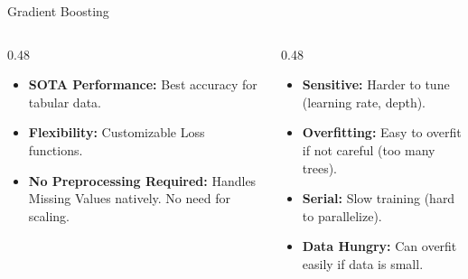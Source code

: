 \begin{frame}{Gradient Boosting}
    \begin{columns}[T]
        \begin{column}{0.48\textwidth}
            \begin{tcolorbox}[colback=green!5, title=\textbf{Advantages}]
                \small
                \begin{itemize}
                    \item \textbf{SOTA Performance:} Best accuracy for tabular data.
                    \item \textbf{Flexibility:} Customizable Loss functions.
                    \item \textbf{No Preprocessing Required:} Handles Missing Values natively. No need for scaling.
                \end{itemize}
            \end{tcolorbox}
        \end{column}
        \begin{column}{0.48\textwidth}
            \begin{tcolorbox}[colback=red!5, title=\textbf{Disadvantages}]
                \small
                \begin{itemize}
                    \item \textbf{Sensitive:} Harder to tune (learning rate, depth).
                    \item \textbf{Overfitting:} Easy to overfit if not careful (too many trees).
                    \item \textbf{Serial:} Slow training (hard to parallelize).
                    \item \textbf{Data Hungry:} Can overfit easily if data is small.
                \end{itemize}
            \end{tcolorbox}
        \end{column}
    \end{columns}
\end{frame}


